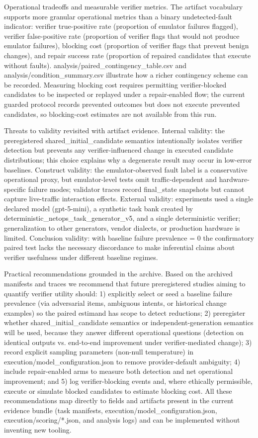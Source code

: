 \documentclass[conference]{IEEEtran}
\begin{document}
Operational tradeoffs and measurable verifier metrics. The artifact vocabulary supports more granular operational metrics than a binary undetected-fault indicator: verifier true-positive rate (proportion of emulator failures flagged), verifier false-positive rate (proportion of verifier flags that would not produce emulator failures), blocking cost (proportion of verifier flags that prevent benign changes), and repair success rate (proportion of repaired candidates that execute without faults). analysis/paired\_contingency\_table.csv and analysis/condition\_summary.csv illustrate how a richer contingency scheme can be recorded. Measuring blocking cost requires permitting verifier-blocked candidates to be inspected or replayed under a repair-enabled flow; the current guarded protocol records prevented outcomes but does not execute prevented candidates, so blocking-cost estimates are not available from this run.

Threats to validity revisited with artifact evidence. Internal validity: the preregistered shared\_initial\_candidate semantics intentionally isolates verifier detection but prevents any verifier-influenced change in executed candidate distributions; this choice explains why a degenerate result may occur in low-error baselines. Construct validity: the emulator-observed fault label is a conservative operational proxy, but emulator-level tests omit traffic-dependent and hardware-specific failure modes; validator traces record final\_state snapshots but cannot capture live-traffic interaction effects. External validity: experiments used a single declared model (gpt-5-mini), a synthetic task bank created by deterministic\_netops\_task\_generator\_v5, and a single deterministic verifier; generalization to other generators, vendor dialects, or production hardware is limited. Conclusion validity: with baseline failure prevalence = 0 the confirmatory paired test lacks the necessary discordance to make inferential claims about verifier usefulness under different baseline regimes.

Practical recommendations grounded in the archive. Based on the archived manifests and traces we recommend that future preregistered studies aiming to quantify verifier utility should:
1) explicitly select or seed a baseline failure prevalence (via adversarial items, ambiguous intents, or historical change examples) so the paired estimand has scope to detect reductions; 2) preregister whether shared\_initial\_candidate semantics or independent-generation semantics will be used, because they answer different operational questions (detection on identical outputs vs. end-to-end improvement under verifier-mediated change); 3) record explicit sampling parameters (non-null temperature) in execution/model\_configuration.json to remove provider-default ambiguity; 4) include repair-enabled arms to measure both detection and net operational improvement; and 5) log verifier-blocking events and, where ethically permissible, execute or simulate blocked candidates to estimate blocking cost. All these recommendations map directly to fields and artifacts present in the current evidence bundle (task manifests, execution/model\_configuration.json, execution/scoring/*.json, and analysis logs) and can be implemented without inventing new tooling.
\end{document}
